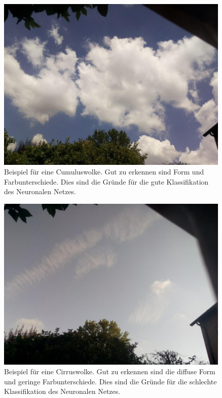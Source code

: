 \newpage

\begin{figure}[ht]
  \centering
  \includegraphics[height=0.25\textheight]{content/cumulus.pdf}
  \caption{Beispiel für eine Cumuluswolke. Gut zu erkennen sind Form und Farbunterschiede. Dies
  sind die Gründe für die gute Klassifikation des Neuronalen Netzes.}
  \label{fig:cumulus}
\end{figure}

\begin{figure}[ht]
  \centering
  \includegraphics[height=0.25\textheight]{content/cirrus.pdf}
  \caption{Beispiel für eine Cirruswolke. Gut zu erkennen sind die diffuse Form und geringe Farbunterschiede. Dies
  sind die Gründe für die schlechte Klassifikation des Neuronalen Netzes.}
  \label{fig:cirrus}
\end{figure}
